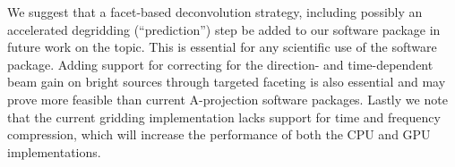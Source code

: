 We suggest that a facet-based deconvolution strategy, including possibly an accelerated degridding (``prediction'') step be added to our software package in future work on the topic. This
is essential for any scientific use of the software package. Adding support for correcting for the direction- and time-dependent beam gain on bright sources through targeted faceting is
also essential and may prove more feasible than current A-projection software packages. Lastly we note that the current gridding implementation lacks support for time and frequency compression,
which will increase the performance of both the CPU and GPU implementations.

